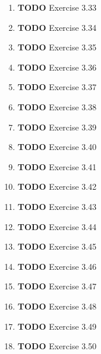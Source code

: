 \documentclass[11pt]{article}
\begin{document}
\begin{enumerate}
\begin{enumerate}
\item {\bfseries\sffamily TODO} Exercise 3.33
\label{sec:org7ca93c6}

\item {\bfseries\sffamily TODO} Exercise 3.34
\label{sec:org2f6d517}

\item {\bfseries\sffamily TODO} Exercise 3.35
\label{sec:org8c0ef60}

\item {\bfseries\sffamily TODO} Exercise 3.36
\label{sec:orgca4b545}

\item {\bfseries\sffamily TODO} Exercise 3.37
\label{sec:orgcab4d80}

\item {\bfseries\sffamily TODO} Exercise 3.38
\label{sec:org8df1504}

\item {\bfseries\sffamily TODO} Exercise 3.39
\label{sec:org069d8fe}

\item {\bfseries\sffamily TODO} Exercise 3.40
\label{sec:org490d433}

\item {\bfseries\sffamily TODO} Exercise 3.41
\label{sec:org2b74c88}

\item {\bfseries\sffamily TODO} Exercise 3.42
\label{sec:org7658d8d}

\item {\bfseries\sffamily TODO} Exercise 3.43
\label{sec:orga29da62}

\item {\bfseries\sffamily TODO} Exercise 3.44
\label{sec:orga836416}

\item {\bfseries\sffamily TODO} Exercise 3.45
\label{sec:org1aeb0d7}

\item {\bfseries\sffamily TODO} Exercise 3.46
\label{sec:org9cec346}

\item {\bfseries\sffamily TODO} Exercise 3.47
\label{sec:orgf662e4c}

\item {\bfseries\sffamily TODO} Exercise 3.48
\label{sec:org04a3113}

\item {\bfseries\sffamily TODO} Exercise 3.49
\label{sec:org64053ad}

\item {\bfseries\sffamily TODO} Exercise 3.50
\label{sec:orge814182}


\end{enumerate}
\end{enumerate}
\end{document}

